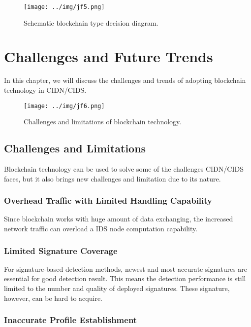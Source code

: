 \documentclass[12pt]{report}
\begin{document}
\begin{figure}[H]
	\centering
	\texttt{[image: ../img/jf5.png]}
	\caption{Schematic blockchain type decision diagram. \cite{8274922}}
	\label{fig:jf5}
\end{figure}


\chapter{Challenges and Future Trends}

In this chapter, we will discuss the challenges and trends of adopting blockchain technology in CIDN/CIDS.

\begin{figure}[H]
	\centering
	\texttt{[image: ../img/jf6.png]}
	\caption{Challenges and limitations of blockchain technology. \cite{8274922}}
	\label{fig:jf6}
\end{figure}

\section{Challenges and Limitations}

Blockchain technology can be used to solve some of the challenges CIDN/CIDS faces, but it also brings new challenges and limitation due to its nature.

\subsection{Overhead Traffic with Limited Handling Capability}

Since blockchain works with huge amount of data exchanging, the increased network traffic can overload a IDS node computation capability.

\subsection{Limited Signature Coverage}

For signature-based detection methods, newest and most accurate signatures are essential for good detection result. This means the detection performance is still limited to the number and quality of deployed signatures. These signature, however, can be hard to acquire.

\subsection{Inaccurate Profile Establishment}
\end{document}
